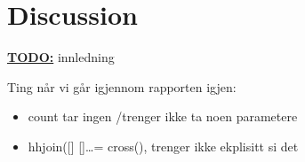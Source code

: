 \chapter{Discussion}
\label{chapter:discussion}

\textbf{\underline{\LARGE TODO:}} innledning

Ting n\aa r vi g\aa r igjennom rapporten igjen:
\begin{itemize}
  \item count tar ingen /trenger ikke ta noen parametere
  \item hhjoin([] []\ldots = cross(), trenger ikke ekplisitt si det
\end{itemize}












